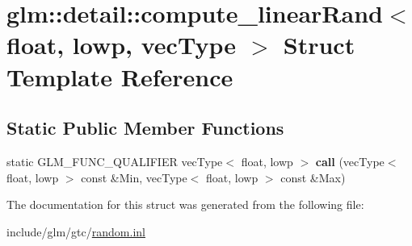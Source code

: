 \hypertarget{structglm_1_1detail_1_1compute__linearRand_3_01float_00_01lowp_00_01vecType_01_4}{}\section{glm\+:\+:detail\+:\+:compute\+\_\+linear\+Rand$<$ float, lowp, vec\+Type $>$ Struct Template Reference}
\label{structglm_1_1detail_1_1compute__linearRand_3_01float_00_01lowp_00_01vecType_01_4}
\subsection*{Static Public Member Functions}
\begin{DoxyCompactItemize}
\item 
\mbox{\label{structglm_1_1detail_1_1compute__linearRand_3_01float_00_01lowp_00_01vecType_01_4_a7fa98be90215a865635df999883a55ca}} 
static G\+L\+M\+\_\+\+F\+U\+N\+C\+\_\+\+Q\+U\+A\+L\+I\+F\+I\+ER vec\+Type$<$ float, lowp $>$ {\bfseries call} (vec\+Type$<$ float, lowp $>$ const \&Min, vec\+Type$<$ float, lowp $>$ const \&Max)
\end{DoxyCompactItemize}


The documentation for this struct was generated from the following file\+:\begin{DoxyCompactItemize}
\item 
include/glm/gtc/\hyperlink{random_8inl}{random.\+inl}\end{DoxyCompactItemize}
